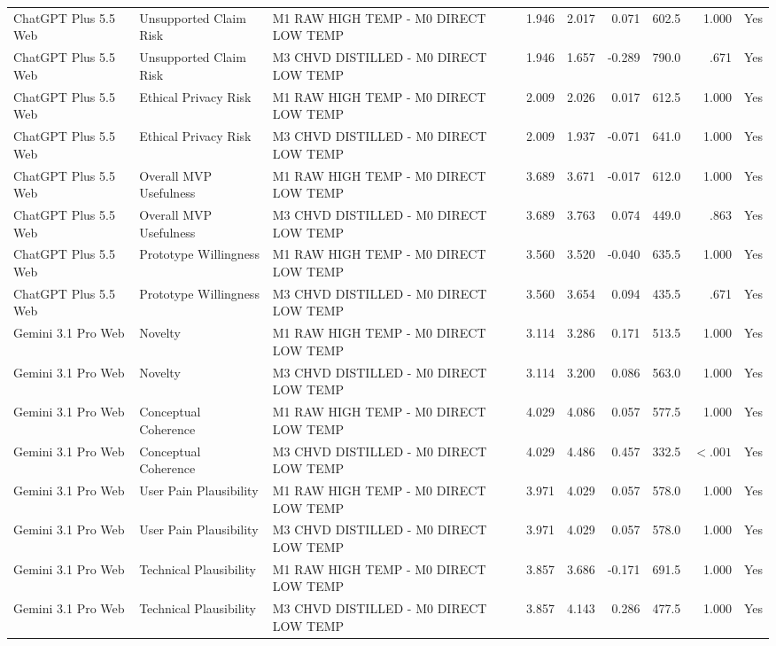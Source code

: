 \documentclass[10pt]{article}
\begin{document}
\begin{landscape}
\begin{longtable}{lllrrrrrr}
ChatGPT Plus 5.5 Web & Unsupported Claim Risk & M1 RAW HIGH TEMP - M0 DIRECT LOW TEMP & 1.946 & 2.017 & 0.071 & 602.5 & 1.000 & Yes \\
ChatGPT Plus 5.5 Web & Unsupported Claim Risk & M3 CHVD DISTILLED - M0 DIRECT LOW TEMP & 1.946 & 1.657 & -0.289 & 790.0 & .671 & Yes \\
ChatGPT Plus 5.5 Web & Ethical Privacy Risk & M1 RAW HIGH TEMP - M0 DIRECT LOW TEMP & 2.009 & 2.026 & 0.017 & 612.5 & 1.000 & Yes \\
ChatGPT Plus 5.5 Web & Ethical Privacy Risk & M3 CHVD DISTILLED - M0 DIRECT LOW TEMP & 2.009 & 1.937 & -0.071 & 641.0 & 1.000 & Yes \\
ChatGPT Plus 5.5 Web & Overall MVP Usefulness & M1 RAW HIGH TEMP - M0 DIRECT LOW TEMP & 3.689 & 3.671 & -0.017 & 612.0 & 1.000 & Yes \\
ChatGPT Plus 5.5 Web & Overall MVP Usefulness & M3 CHVD DISTILLED - M0 DIRECT LOW TEMP & 3.689 & 3.763 & 0.074 & 449.0 & .863 & Yes \\
ChatGPT Plus 5.5 Web & Prototype Willingness & M1 RAW HIGH TEMP - M0 DIRECT LOW TEMP & 3.560 & 3.520 & -0.040 & 635.5 & 1.000 & Yes \\
ChatGPT Plus 5.5 Web & Prototype Willingness & M3 CHVD DISTILLED - M0 DIRECT LOW TEMP & 3.560 & 3.654 & 0.094 & 435.5 & .671 & Yes \\
Gemini 3.1 Pro Web & Novelty & M1 RAW HIGH TEMP - M0 DIRECT LOW TEMP & 3.114 & 3.286 & 0.171 & 513.5 & 1.000 & Yes \\
Gemini 3.1 Pro Web & Novelty & M3 CHVD DISTILLED - M0 DIRECT LOW TEMP & 3.114 & 3.200 & 0.086 & 563.0 & 1.000 & Yes \\
Gemini 3.1 Pro Web & Conceptual Coherence & M1 RAW HIGH TEMP - M0 DIRECT LOW TEMP & 4.029 & 4.086 & 0.057 & 577.5 & 1.000 & Yes \\
Gemini 3.1 Pro Web & Conceptual Coherence & M3 CHVD DISTILLED - M0 DIRECT LOW TEMP & 4.029 & 4.486 & 0.457 & 332.5 & $<.001$ & Yes \\
Gemini 3.1 Pro Web & User Pain Plausibility & M1 RAW HIGH TEMP - M0 DIRECT LOW TEMP & 3.971 & 4.029 & 0.057 & 578.0 & 1.000 & Yes \\
Gemini 3.1 Pro Web & User Pain Plausibility & M3 CHVD DISTILLED - M0 DIRECT LOW TEMP & 3.971 & 4.029 & 0.057 & 578.0 & 1.000 & Yes \\
Gemini 3.1 Pro Web & Technical Plausibility & M1 RAW HIGH TEMP - M0 DIRECT LOW TEMP & 3.857 & 3.686 & -0.171 & 691.5 & 1.000 & Yes \\
Gemini 3.1 Pro Web & Technical Plausibility & M3 CHVD DISTILLED - M0 DIRECT LOW TEMP & 3.857 & 4.143 & 0.286 & 477.5 & 1.000 & Yes \\

\end{longtable}
\end{landscape}
\end{document}
